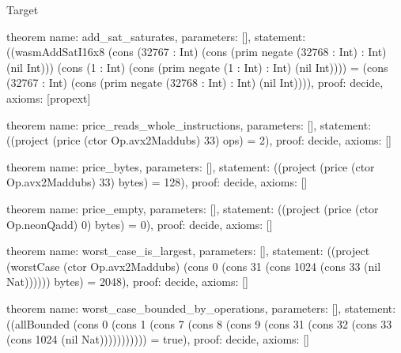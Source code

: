 \begin{lexlean}{Target}
\begin{semanticmodule}
theorem{
  name: add_sat_saturates,
  parameters: [],
  statement: ((wasmAddSatI16x8 (cons (32767 : Int) (cons (prim negate (32768 : Int) : Int) (nil Int))) (cons (1 : Int) (cons (prim negate (1 : Int) : Int) (nil Int)))) = (cons (32767 : Int) (cons (prim negate (32768 : Int) : Int) (nil Int)))),
  proof: decide{},
  axioms: [propext]
}

theorem{
  name: price_reads_whole_instructions,
  parameters: [],
  statement: ((project (price (ctor Op.avx2Maddubs) 33) ops) = 2),
  proof: decide{},
  axioms: []
}

theorem{
  name: price_bytes,
  parameters: [],
  statement: ((project (price (ctor Op.avx2Maddubs) 33) bytes) = 128),
  proof: decide{},
  axioms: []
}

theorem{
  name: price_empty,
  parameters: [],
  statement: ((project (price (ctor Op.neonQadd) 0) bytes) = 0),
  proof: decide{},
  axioms: []
}

theorem{
  name: worst_case_is_largest,
  parameters: [],
  statement: ((project (worstCase (ctor Op.avx2Maddubs) (cons 0 (cons 31 (cons 1024 (cons 33 (nil Nat)))))) bytes) = 2048),
  proof: decide{},
  axioms: []
}

theorem{
  name: worst_case_bounded_by_operations,
  parameters: [],
  statement: ((allBounded (cons 0 (cons 1 (cons 7 (cons 8 (cons 9 (cons 31 (cons 32 (cons 33 (cons 1024 (nil Nat))))))))))) = true),
  proof: decide{},
  axioms: []
}
\end{semanticmodule}
\end{lexlean}
